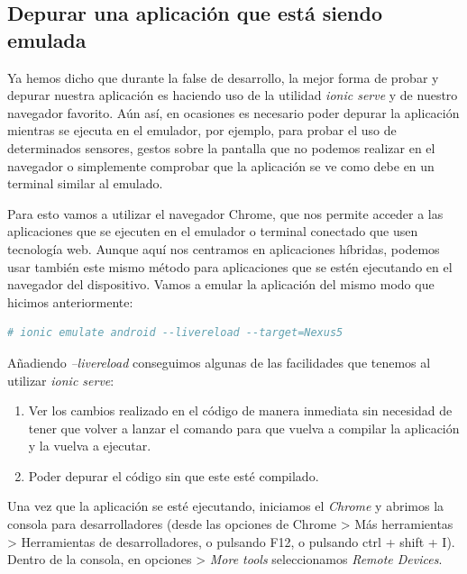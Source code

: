 \subsection{Depurar una aplicación que está siendo emulada}

Ya hemos dicho que durante la false de desarrollo, la mejor forma de probar y depurar nuestra aplicación es haciendo uso de la utilidad \emph{ionic serve} y de nuestro navegador favorito. Aún así, en ocasiones es necesario poder depurar la aplicación mientras se ejecuta en el emulador, por ejemplo, para probar el uso de determinados sensores, gestos sobre la pantalla que no podemos realizar en el navegador o simplemente comprobar que la aplicación se ve como debe en un terminal similar al emulado.

Para esto vamos a utilizar el navegador Chrome, que nos permite acceder a las aplicaciones que se ejecuten en el emulador o terminal conectado que usen tecnología web. Aunque aquí nos centramos en aplicaciones híbridas, podemos usar también este mismo método para aplicaciones que se estén ejecutando en el navegador del dispositivo. Vamos a emular la aplicación del mismo modo que hicimos anteriormente:

\begin{lstlisting}[language=bash]
  # ionic emulate android --livereload --target=Nexus5
\end{lstlisting}

Añadiendo \emph{--livereload} conseguimos algunas de las facilidades que tenemos al utilizar \emph{ionic serve}:

\begin{enumerate}
  \item Ver los cambios realizado en el código de manera inmediata sin necesidad de tener que volver a lanzar el comando para que vuelva a compilar la aplicación y la vuelva a ejecutar.
  \item Poder depurar el código sin que este esté compilado.
\end{enumerate}


Una vez que la aplicación se esté ejecutando, iniciamos el \emph{Chrome} y abrimos la consola para desarrolladores (desde las opciones de Chrome > Más herramientas > Herramientas de desarrolladores, o pulsando F12, o pulsando ctrl + shift + I). Dentro de la consola, en opciones > \emph{More tools} seleccionamos \emph{Remote Devices}.

